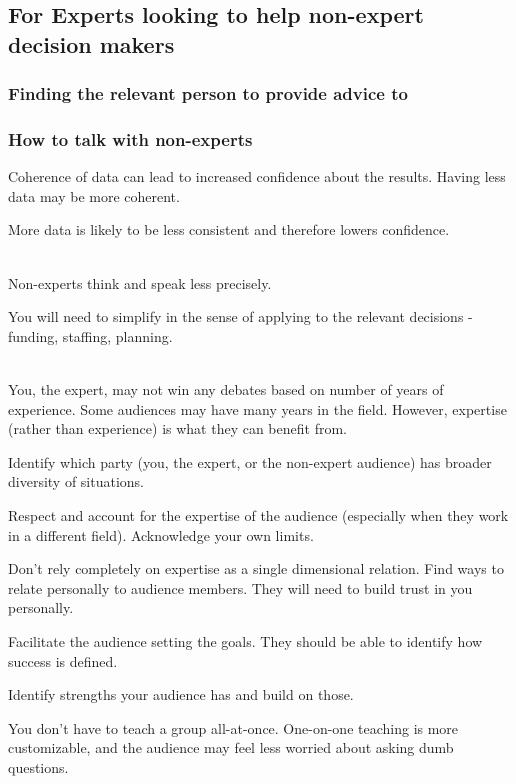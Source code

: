 \subsection*{For Experts looking to help non-expert decision makers}


\subsubsection*{Finding the relevant person to provide advice to}



\subsubsection*{How to talk with non-experts}

Coherence of data can lead to increased confidence about the results.
Having less data may be more coherent. 

More data is likely to be less consistent and therefore lowers confidence.

\ \\

Non-experts think and speak less precisely.

You will need to simplify in the sense of applying to the relevant decisions - funding, staffing, planning.

\ \\

You, the expert, may not win any debates based on number of years of experience. Some audiences may have many years in the field. However, expertise (rather than experience) is what they can benefit from. 

Identify which party (you, the expert, or the non-expert audience) has broader diversity of situations.

Respect and account for the expertise of the audience (especially when they work in a different field). Acknowledge your own limits.

Don't rely completely on expertise as a single dimensional relation. Find ways to relate personally to audience members. They will need to build trust in you personally.

Facilitate the audience setting the goals. They should be able to identify how success is defined.

Identify strengths your audience has and build on those.

You don't have to teach a group all-at-once. One-on-one teaching is more customizable, and the audience may feel less worried about asking dumb questions.

